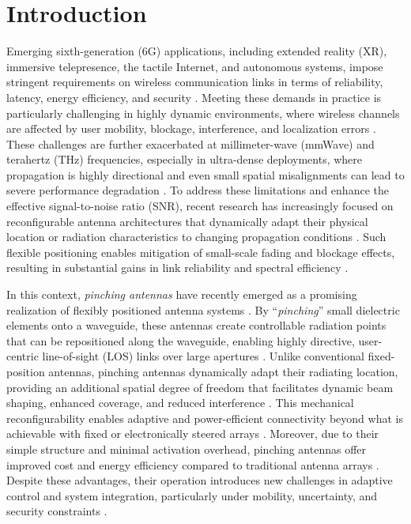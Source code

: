 \documentclass[journal,10pt]{IEEEtran}
\begin{document}
\section{Introduction}
Emerging sixth-generation (6G) applications, including extended reality (XR), immersive telepresence, the tactile Internet, and autonomous systems, impose stringent requirements on wireless communication links in terms of reliability, latency, energy efficiency, and security \cite{saad2019vision,10753482}. Meeting these demands in practice is particularly challenging in highly dynamic environments, where wireless channels are affected by user mobility, blockage, interference, and localization errors \cite{bennis2018ultrareliable}. These challenges are further exacerbated at millimeter-wave (mmWave) and terahertz (THz) frequencies, especially in ultra-dense deployments, where propagation is highly directional and even small spatial misalignments can lead to severe performance degradation \cite{Rappaport2013,9882323}. To address these limitations and enhance the effective signal-to-noise ratio (SNR), recent research has increasingly focused on reconfigurable antenna architectures that dynamically adapt their physical location or radiation characteristics to changing propagation conditions \cite{Zhu2024}. Such flexible positioning enables mitigation of small-scale fading and blockage effects, resulting in substantial gains in link reliability and spectral efficiency \cite{Zhou2025}.


In this context, \emph{pinching antennas} have recently emerged as a promising realization of flexibly positioned antenna systems \cite{Ding2025}. By “\textit{pinching}” small dielectric elements onto a waveguide, these antennas create controllable radiation points that can be repositioned along the waveguide, enabling highly directive, user-centric line-of-sight (LOS) links over large apertures \cite{suzuki2022pinching}. Unlike conventional fixed-position antennas, pinching antennas dynamically adapt their radiating location, providing an additional spatial degree of freedom that facilitates dynamic beam shaping, enhanced coverage, and reduced interference \cite{Mao2025}. This mechanical reconfigurability enables adaptive and power-efficient connectivity beyond what is achievable with fixed or electronically steered arrays \cite{Samy2025}. Moreover, due to their simple structure and minimal activation overhead, pinching antennas offer improved cost and energy efficiency compared to traditional antenna arrays \cite{11169486}. Despite these advantages, their operation introduces new challenges in adaptive control and system integration, particularly under mobility, uncertainty, and security constraints \cite{Yang2025}.
\end{document}
